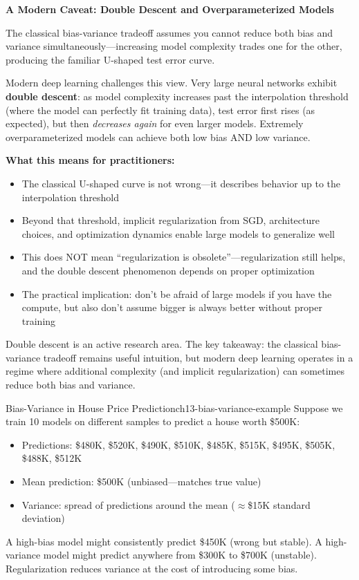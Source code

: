 \documentclass[../../main.tex]{subfiles}
\begin{document}
\begin{important}
\textbf{A Modern Caveat: Double Descent and Overparameterized Models}

The classical bias-variance tradeoff assumes you cannot reduce both bias and variance simultaneously---increasing model complexity trades one for the other, producing the familiar U-shaped test error curve.

Modern deep learning challenges this view. Very large neural networks exhibit \textbf{double descent}: as model complexity increases past the interpolation threshold (where the model can perfectly fit training data), test error first rises (as expected), but then \textit{decreases again} for even larger models. Extremely overparameterized models can achieve both low bias AND low variance.

\textbf{What this means for practitioners:}
\begin{itemize}
    \item The classical U-shaped curve is not wrong---it describes behavior up to the interpolation threshold
    \item Beyond that threshold, implicit regularization from SGD, architecture choices, and optimization dynamics enable large models to generalize well
    \item This does NOT mean ``regularization is obsolete''---regularization still helps, and the double descent phenomenon depends on proper optimization
    \item The practical implication: don't be afraid of large models if you have the compute, but also don't assume bigger is always better without proper training
\end{itemize}

Double descent is an active research area. The key takeaway: the classical bias-variance tradeoff remains useful intuition, but modern deep learning operates in a regime where additional complexity (and implicit regularization) can sometimes reduce both bias and variance.
\end{important}

\begin{example}{Bias-Variance in House Price Prediction}{ch13-bias-variance-example}
Suppose we train 10 models on different samples to predict a house worth \$500K:
\begin{itemize}
    \item Predictions: \$480K, \$520K, \$490K, \$510K, \$485K, \$515K, \$495K, \$505K, \$488K, \$512K
    \item Mean prediction: \$500K (unbiased---matches true value)
    \item Variance: spread of predictions around the mean ($\approx$\$15K standard deviation)
\end{itemize}
A high-bias model might consistently predict \$450K (wrong but stable). A high-variance model might predict anywhere from \$300K to \$700K (unstable). Regularization reduces variance at the cost of introducing some bias.
\end{example}
\end{document}
